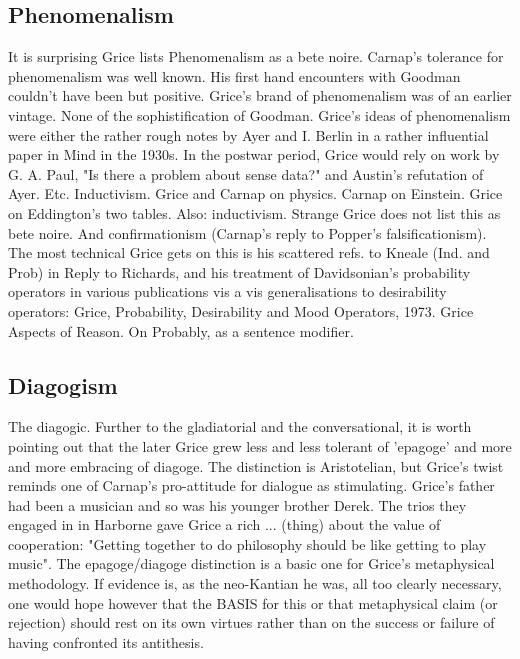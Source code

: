 \documentclass[10pt,titlepage]{book}
\begin{document}
\subsection{Phenomenalism}

It is surprising Grice lists Phenomenalism as a bete 
noire. Carnap's tolerance  for phenomenalism was well known. His first hand 
encounters with Goodman  couldn't have been but positive. Grice's brand of 
phenomenalism was of an  earlier vintage. None of the sophistification of 
Goodman. Grice's ideas of  phenomenalism were either the rather rough notes by Ayer 
and I. Berlin in a  rather influential paper in Mind in the 1930s. In the 
postwar period, Grice  would rely on work by G. A. Paul, "Is there a problem 
about sense data?" and  Austin's refutation of Ayer. Etc. 
Inductivism.  Grice and Carnap on physics. Carnap on Einstein. Grice on 
Eddington's two  tables. Also: 
inductivism.  Strange Grice does not list this as bete noire. And 
confirmationism (Carnap's  reply to Popper's falsificationism). The most technical 
Grice gets on this is  his scattered refs. to Kneale (Ind. and Prob) in Reply 
to Richards, and his  treatment of Davidsonian's probability operators in 
various publications vis a  vis generalisations to desirability operators:  
Grice, Probability, Desirability and Mood  Operators, 1973. Grice Aspects of 
Reason. On Probably, as a sentence modifier.   

\subsection{Diagogism}

 The  diagogic. Further to the gladiatorial and the 
conversational, it is  worth  pointing out that the later Grice grew less and less 
tolerant of 'epagoge'   and more and more embracing of diagoge. The distinction is 
Aristotelian,  but  Grice's twist reminds one of Carnap's pro-attitude for 
dialogue  as   stimulating. Grice's  father had been a musician and so was 
his younger brother Derek.  The trios  they engaged in in Harborne gave Grice 
a rich ... (thing) about the value of  cooperation: "Getting together to do 
philosophy should be like getting  to  play music". The epagoge/diagoge 
distinction is a basic one for Grice's  metaphysical  methodology. If evidence 
is, as the neo-Kantian he was, all  too clearly  
necessary, one would hope however that the BASIS for this  or that 
metaphysical  claim (or rejection) should rest on its own virtues  rather than on 
the success  or failure of having confronted its  antithesis. 
\end{document}
